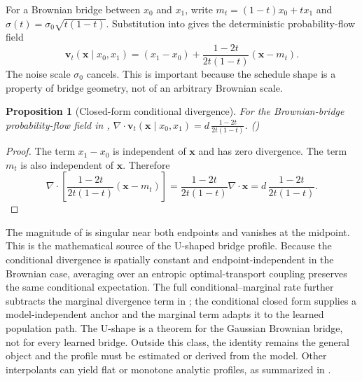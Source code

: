 \documentclass{article}
\newcommand{\vx}{\bm{x}}
\newcommand{\vv}{\bm{v}}
\newcommand{\diver}{\nabla\!\cdot}
\newcommand{\inlineeqtag}[1]{\refstepcounter{equation}\label{#1}\nobreak\hfill\textup{(\theequation)}\par}
\theoremstyle{plain}
\newtheorem{proposition}{Proposition}
\theoremstyle{definition}
\theoremstyle{remark}
\begin{document}
For a Brownian bridge between $x_0$ and $x_1$, write
  $m_t=(1-t)x_0+tx_1$ %
  and
  $\sigma(t)=\sigma_0\sqrt{t(1-t)}$.
Substitution into  gives the deterministic probability-flow field
\begin{equation}
  \vv_t(\vx\mid x_0,x_1)
  =
  (x_1-x_0)
  +
  \frac{1-2t}{2t(1-t)}(\vx-m_t).
  \label{eq:bb_ode_field}
\end{equation}
The noise scale $\sigma_0$ cancels. This is important because the schedule shape is a property of bridge geometry, not of an arbitrary Brownian scale.

\begin{proposition}[Closed-form conditional divergence]
    \label{prop:bb_divergence}
    For the Brownian-bridge probability-flow field in , \(\displaystyle \diver \vv_t(\vx\mid x_0,x_1)=d\,\frac{1-2t}{2t(1-t)}\). \inlineeqtag{eq:bb_divergence}
    \end{proposition}

\begin{proof}
The term $x_1-x_0$ is independent of $\vx$ and has zero divergence. The term $m_t$ is also independent of $\vx$. Therefore
\begin{equation}
  \diver \left[\frac{1-2t}{2t(1-t)}(\vx-m_t)\right]
  =
  \frac{1-2t}{2t(1-t)}\diver \vx
  =
  d\,\frac{1-2t}{2t(1-t)}.
\end{equation}
\end{proof}

The magnitude of  is singular near both endpoints and vanishes at the midpoint. This is the mathematical source of the U-shaped bridge profile. Because the conditional divergence is spatially constant and endpoint-independent in the Brownian case, averaging over an entropic optimal-transport coupling preserves the same conditional expectation. The full conditional--marginal rate further subtracts the marginal divergence term in ; the conditional closed form supplies a model-independent anchor and the marginal term adapts it to the learned population path. The U-shape is a theorem for the Gaussian Brownian bridge, not for every learned bridge. Outside this class, the identity remains the general object and the profile must be estimated or derived from the model. Other interpolants can yield flat or monotone analytic profiles, as summarized in .
\end{document}
